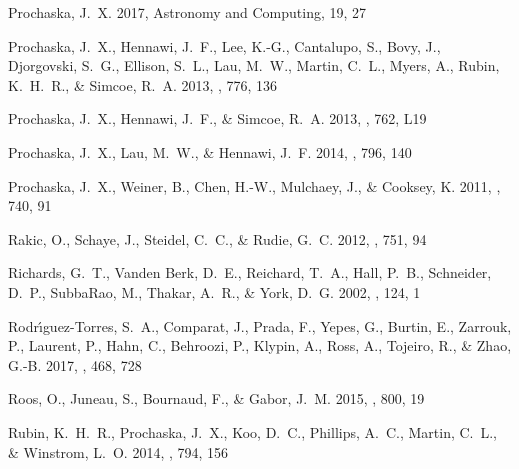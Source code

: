 \documentclass[iop]{emulateapj}
\begin{document}
{\begin{thebibliography}{52}
{Prochaska}, J.~X. 2017, Astronomy and Computing, 19, 27

{Prochaska}, J.~X., {Hennawi}, J.~F., {Lee}, K.-G., {Cantalupo}, S., {Bovy},
  J., {Djorgovski}, S.~G., {Ellison}, S.~L., {Lau}, M.~W., {Martin}, C.~L.,
  {Myers}, A., {Rubin}, K.~H.~R., \& {Simcoe}, R.~A. 2013{}, \apj,
  776, 136

{Prochaska}, J.~X., {Hennawi}, J.~F., \& {Simcoe}, R.~A. 2013{},
  \apjl, 762, L19

{Prochaska}, J.~X., {Lau}, M.~W., \& {Hennawi}, J.~F. 2014, \apj, 796, 140

{Prochaska}, J.~X., {Weiner}, B., {Chen}, H.-W., {Mulchaey}, J., \& {Cooksey},
  K. 2011, \apj, 740, 91

{Rakic}, O., {Schaye}, J., {Steidel}, C.~C., \& {Rudie}, G.~C. 2012, \apj, 751,
  94

{Richards}, G.~T., {Vanden Berk}, D.~E., {Reichard}, T.~A., {Hall}, P.~B.,
  {Schneider}, D.~P., {SubbaRao}, M., {Thakar}, A.~R., \& {York}, D.~G. 2002,
  \aj, 124, 1

{Rodr{\'{\i}}guez-Torres}, S.~A., {Comparat}, J., {Prada}, F., {Yepes}, G.,
  {Burtin}, E., {Zarrouk}, P., {Laurent}, P., {Hahn}, C., {Behroozi}, P.,
  {Klypin}, A., {Ross}, A., {Tojeiro}, R., \& {Zhao}, G.-B. 2017, \mnras, 468,
  728

{Roos}, O., {Juneau}, S., {Bournaud}, F., \& {Gabor}, J.~M. 2015, \apj, 800, 19

{Rubin}, K.~H.~R., {Prochaska}, J.~X., {Koo}, D.~C., {Phillips}, A.~C.,
  {Martin}, C.~L., \& {Winstrom}, L.~O. 2014, \apj, 794, 156


\end{thebibliography}}
\end{document}
